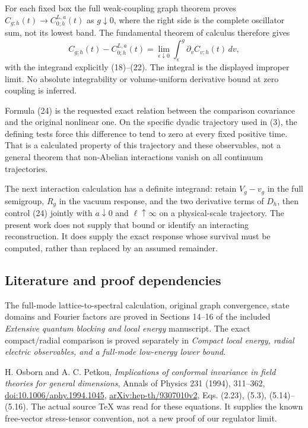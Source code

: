 \documentclass[
  11pt,
]{article}
\begin{document}
For each fixed box the full weak-coupling graph theorem proves
\(C_{g;h}(t)\to C_{0;h}^{L,a}(t)\) as \(g\downarrow0\), where the right
side is the complete oscillator sum, not its lowest band. The
fundamental theorem of calculus therefore gives \[
 \boxed{C_{g;h}(t)-C_{0;h}^{L,a}(t)
       =\lim_{\epsilon\downarrow0}
                    \int_\epsilon^g \partial_vC_{v;h}(t)\,dv,}
 \tag{24}
\] with the integrand explicitly (18)--(22). The integral is the
displayed improper limit. No absolute integrability or volume-uniform
derivative bound at zero coupling is inferred.

Formula (24) is the requested exact relation between the comparison
covariance and the original nonlinear one. On the specific dyadic
trajectory used in (3), the defining tests force this difference to tend
to zero at every fixed positive time. That is a calculated property of
this trajectory and these observables, not a general theorem that
non-Abelian interactions vanish on all continuum trajectories.

The next interaction calculation has a definite integrand: retain
\(V_g-v_g\) in the full semigroup, \(R_g\) in the vacuum response, and
the two derivative terms of \(D_h\), then control (24) jointly with
\(a\downarrow0\) and \(\ell\uparrow\infty\) on a physical-scale
trajectory. The present work does not supply that bound or identify an
interacting reconstruction. It does supply the exact response whose
survival must be computed, rather than replaced by an assumed remainder.

\subsection{Literature and proof
dependencies}\label{weak-coupling-part-11-literature-and-proof-dependencies}

The full-mode lattice-to-spectral calculation, original graph
convergence, state domains and Fourier factors are proved in Sections
14--16 of the included \emph{Extensive quantum blocking and local
energy} manuscript. The exact compact/radial comparison is proved
separately in \emph{Compact local energy, radial electric observables,
and a full-mode low-energy lower bound}.

H. Osborn and A. C. Petkou, \emph{Implications of conformal invariance
in field theories for general dimensions}, Annals of Physics 231 (1994),
311--362,
\href{https://doi.org/10.1006/aphy.1994.1045}{doi:10.1006/aphy.1994.1045},
\href{https://arxiv.org/abs/hep-th/9307010v2}{arXiv:hep-th/9307010v2},
Eqs. (2.23), (5.3), (5.14)--(5.16). The actual source TeX was read for
these equations. It supplies the known free-vector stress-tensor
convention, not a new proof of our regulator limit.
\end{document}
